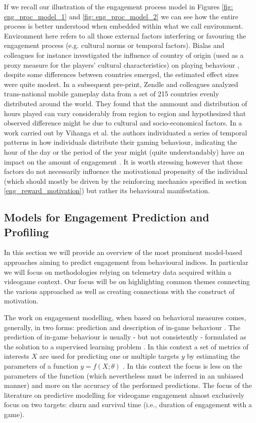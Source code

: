 If we recall our illustration of the engagement process model in Figures \ref{fig: eng_proc_model_1} and \ref{fig: eng_proc_model_2} we can see how the entire process is better understood when embedded within what we call environment. Environment here refers to all those external factors interfering or favouring the engagement process (e.g. cultural norms or temporal factors). Bialas and colleagues for instance investigated the influence of country of origin (used as a proxy measure for the players’ cultural characteristics) on playing behaviour \cite{bialas2014cultural}, despite some differences between countries emerged, the estimated effect sizes were quite modest.
In a subsequent pre-print, Zendle and colleagues \cite{zendle2022transnational} analyzed trans-national mobile gameplay data from a set of 215 countries evenly distributed around the world. They found that the ammount and distribution of hours played can vary considerably from region to region and hypothesized that observed difference might be due to cultural and socio-economical factors. In a work carried out by Vihanga et al. the authors individuated a series of temporal patterns in how individuals distribute their gaming behaviour, indicating the hour of the day or the period of the year might (quite understandably) have an impact on the amount of engagement \cite{vihanga2019weekly}. It is worth stressing however that these factors do not necessarily influence the motivational propensity of the individual (which should mostly be driven by the reinforcing mechanics specified in section \ref{eng_reward_motivation}) but rather its behavioural manifestation.

\subsection{Models for Engagement Prediction and Profiling}
\label{engagement_prediction}
In this section we will provide an overview of the most prominent model-based approaches aiming to predict engagement from behavioural indices. In particular we will focus on methodologies relying on telemetry data acquired within a videogame context. Our focus will be on highlighting common themes connecting the various approached as well as creating connections with the construct of motivation. 

The work on engagement modelling, when based on behavioral measures comes, generally, in two forms: prediction and description of in-game behaviour \cite{el2016game}. The prediction of in-game behaviour is usually - but not consistently - formulated as the solution to a supervised learning problem \cite{el2016game}. In this context a set of metrics of interests $X$ are used for predicting one or multiple targets $y$ by estimating the parameters of a function $y = f(X; \theta)$ \cite{bishop2006pattern}. In this context the focus is less on the parameters of the function (which nevertheless must be inferred in an unbiased manner) and more on the accuracy of the performed predictions. The focus of the literature on predictive modelling for videogame engagement almost exclusively focus on two targets: churn and survival time (i.e., duration of engagement with a game). 


